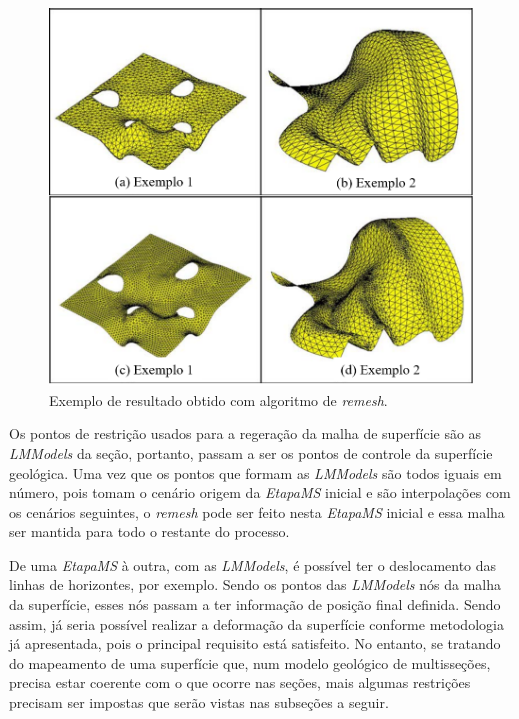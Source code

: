 \begin{figure} [H]
  \begin{center}
    \includegraphics[width=350pt]{images/fig-remesh}
    \caption{Exemplo de resultado obtido com algoritmo de \textit{remesh}\cite{Miranda}.}\label{fig-remesh}
  \end{center}
\end{figure}

Os pontos de restrição usados para a regeração da malha de superfície são as \textit{LMModels} da seção, portanto, passam a ser os pontos de controle da superfície geológica. Uma vez que os pontos que formam as \textit{LMModels} são todos iguais em número, pois tomam o cenário origem da \textit{EtapaMS} inicial e são interpolações com os cenários seguintes, o \textit{remesh} pode ser feito nesta \textit{EtapaMS} inicial e essa malha ser mantida para todo o restante do processo.

De uma \textit{EtapaMS} à outra, com as \textit{LMModels}, é possível ter o deslocamento das linhas de horizontes, por exemplo. Sendo os pontos das \textit{LMModels} nós da malha da superfície, esses nós passam a ter informação de posição final definida. Sendo assim, já seria possível realizar a deformação da superfície conforme metodologia já apresentada, pois o principal requisito está satisfeito. No entanto, se tratando do mapeamento de uma superfície que, num modelo geológico de multisseções, precisa estar coerente com o que ocorre nas seções, mais algumas restrições precisam ser impostas que serão vistas nas subseções a seguir.

